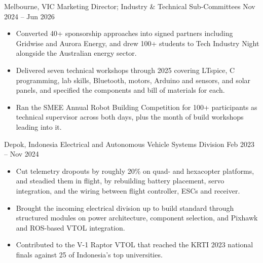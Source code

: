 {Melbourne, VIC}
{Marketing Director; Industry \& Technical Sub-Committees}
{Nov 2024 -- Jun 2026}
{
\begin{itemize}
    \item Converted 40+ sponsorship approaches into signed partners including Gridwise and Aurora Energy, and drew 100+ students to Tech Industry Night alongside the Australian energy sector.
    \item Delivered seven technical workshops through 2025 covering LTspice, C programming, lab skills, Bluetooth, motors, Arduino and sensors, and solar panels, and specified the components and bill of materials for each.
    \item Ran the SMEE Annual Robot Building Competition for 100+ participants as technical supervisor across both days, plus the month of build workshops leading into it.
\end{itemize}
}

{Depok, Indonesia}
{Electrical and Autonomous Vehicle Systems Division}
{Feb 2023 -- Nov 2024}
{
\begin{itemize}
    \item Cut telemetry dropouts by roughly 20\% on quad- and hexacopter platforms, and steadied them in flight, by rebuilding battery placement, servo integration, and the wiring between flight controller, ESCs and receiver.
    \item Brought the incoming electrical division up to build standard through structured modules on power architecture, component selection, and Pixhawk and ROS-based VTOL integration.
    \item Contributed to the V-1 Raptor VTOL that reached the KRTI 2023 national finals against 25 of Indonesia's top universities.
\end{itemize}
}
